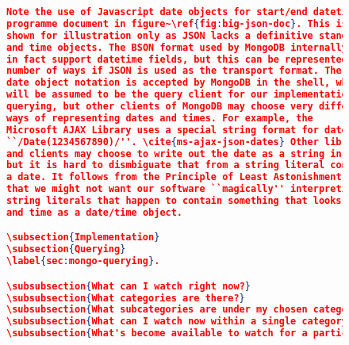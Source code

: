 \documentclass[11pt,a4paper]{article}
\begin{document}
\begin{figure}[p]
\begin{lstlisting}[language=json]
Note the use of Javascript date objects for start/end datetimes in our
programme document in figure~\ref{fig:big-json-doc}. This is
shown for illustration only as JSON lacks a definitive standard for date
and time objects. The BSON format used by MongoDB internally does
in fact support datetime fields, but this can be represented in a
number of ways if JSON is used as the transport format. The Javascript
date object notation is accepted by MongoDB in the shell, which
will be assumed to be the query client for our implementation and
querying, but other clients of MongoDB may choose very different
ways of representing dates and times. For example, the
Microsoft AJAX Library uses a special string format for dates in JSON:
``/Date(1234567890)/''. \cite{ms-ajax-json-dates} Other libraries
and clients may choose to write out the date as a string in ISO-8601 format,
but it is hard to dismbiguate that from a string literal containing
a date. It follows from the Principle of Least Astonishment again
that we might not want our software ``magically'' interpreting
string literals that happen to contain something that looks like a date
and time as a date/time object.

\subsection{Implementation}
\subsection{Querying}
\label{sec:mongo-querying}.

\subsubsection{What can I watch right now?}
\subsubsection{What categories are there?}
\subsubsection{What subcategories are under my chosen category?}
\subsubsection{What can I watch now within a single category?}
\subsubsection{What's become available to watch for a particular TV/Radio channel?}

\end{lstlisting}
\end{figure}
\end{document}

